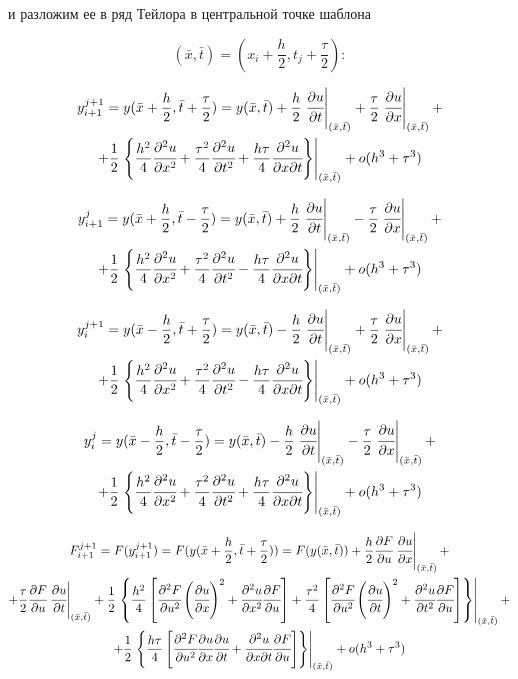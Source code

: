 \documentclass[12pt]{article}
\def\dd#1#2{\cfrac{\partial#1}{\partial#2}}
\def\ddd#1#2#3{\cfrac{\partial^2#1}{\partial#2\partial#3}}
\def\dddd#1#2{\cfrac{\partial^2#1}{\partial{#2}^2}}
\def \atxt#1{\left.#1\right|_{(\bar{x},\bar{t})}}
\begin{document}
		и разложим ее в ряд Тейлора в центральной точке шаблона
		
		$$(\bar{x}, \bar{t}) = (x_i + \frac{h}{2}, t_j + \frac{\tau}{2}):$$
		
		\begin{multline}
			y^{j+1}_{i+1} = y(\bar{x} + \frac{h}{2}, \bar{t} + \frac{\tau}{2}) =  y(\bar{x}, \bar{t}) + \frac{h}{2}\atxt{\dd{u}t} + \frac{\tau}{2}\atxt{\dd{u}x} +\\
			+ \frac{1}{2}\atxt{\left\{ \frac{h^2}{4}\dddd{u}x + \frac{\tau^2}{4}\dddd{u}t + \frac{h\tau}{4}\ddd{u}{x}t \right\}} + o(h^3 + \tau^3)
		\end{multline}
		
		\begin{multline}
			y^{j}_{i+1} = y(\bar{x} + \frac{h}{2}, \bar{t} - \frac{\tau}{2}) =  y(\bar{x}, \bar{t}) + \frac{h}{2}\atxt{\dd{u}t} - \frac{\tau}{2}\atxt{\dd{u}x} +\\
			+ \frac{1}{2}\atxt{\left\{ \frac{h^2}{4}\dddd{u}x + \frac{\tau^2}{4}\dddd{u}t - \frac{h\tau}{4}\ddd{u}{x}t \right\}} + o(h^3 + \tau^3)
		\end{multline}
		
		\begin{multline}
			y^{j+1}_{i} = y(\bar{x} - \frac{h}{2}, \bar{t} + \frac{\tau}{2}) =  y(\bar{x}, \bar{t}) - \frac{h}{2}\atxt{\dd{u}t} + \frac{\tau}{2}\atxt{\dd{u}x} +\\
			+ \frac{1}{2}\atxt{\left\{ \frac{h^2}{4}\dddd{u}x + \frac{\tau^2}{4}\dddd{u}t - \frac{h\tau}{4}\ddd{u}{x}t \right\}} + o(h^3 + \tau^3)
		\end{multline}
		
		\begin{multline}
			y^{j}_{i} = y(\bar{x} - \frac{h}{2}, \bar{t} - \frac{\tau}{2}) =  y(\bar{x}, \bar{t}) - \frac{h}{2}\atxt{\dd{u}t} - \frac{\tau}{2}\atxt{\dd{u}x} +\\
			+ \frac{1}{2}\atxt{\left\{ \frac{h^2}{4}\dddd{u}x + \frac{\tau^2}{4}\dddd{u}t + \frac{h\tau}{4}\ddd{u}{x}t \right\}} + o(h^3 + \tau^3)
		\end{multline}

		\begin{multline}
			F^{j+1}_{i+1} = F(y^{j+1}_{i+1}) = F(y(\bar{x} + \frac{h}{2}, \bar{t} + \frac{\tau}{2})) =  F(y(\bar{x}, \bar{t})) + \frac{h}{2}\dd{F}u\atxt{\dd{u}x} + \\
			+\frac{\tau}{2}\dd{F}u\atxt{\dd{u}t} + \frac{1}{2}\atxt{\left\{ \frac{h^2}{4}\left[ \dddd{F}u \left( \dd{u}x\right)^2 + \dddd{u}x\dd{F}u \right] + \frac{\tau^2}{4}\left[ \dddd{F}u\left( \dd{u}t \right)^2 + \dddd{u}t\dd{F}u \right] \right\}}+\\
			+ \frac{1}{2}\atxt{\left\{ \frac{h\tau}{4}\left[ \dddd{F}u\dd{u}x\dd{u}t + \ddd{u}{x}t\dd{F}u \right] \right\}} + o(h^3 + \tau^3)
		\end{multline}
		
\end{document}
